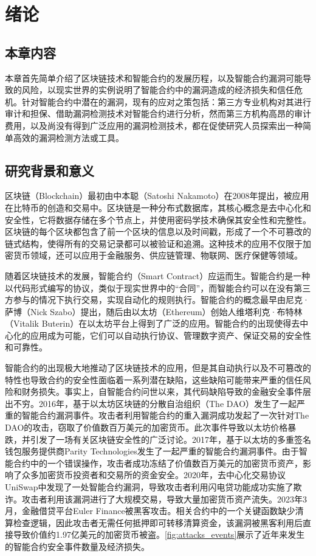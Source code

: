 \chapter{绪论}
\section{本章内容}
\label{sec:本章内容1}
本章首先简单介绍了区块链技术和智能合约的发展历程，以及智能合约漏洞可能导致的风险，以现实世界的实例说明了智能合约中的漏洞造成的经济损失和信任危机。针对智能合约中潜在的漏洞，现有的应对之策包括：第三方专业机构对其进行审计和担保、借助漏洞检测技术对智能合约进行分析，然而第三方机构高昂的审计费用，以及尚没有得到广泛应用的漏洞检测技术，都在促使研究人员探索出一种简单高效的漏洞检测方法或工具。


\section{研究背景和意义}
\label{sec:研究背景和意义}

区块链（Blockchain）最初由中本聪（Satoshi Nakamoto）在2008年提出\cite{nakamoto2008bitcoin}，被应用在比特币的创造和交易中。区块链是一种分布式数据库，其核心概念是去中心化和安全性，它将数据存储在多个节点上，并使用密码学技术确保其安全性和完整性。区块链的每个区块都包含了前一个区块的信息以及时间戳，形成了一个不可篡改的链式结构，使得所有的交易记录都可以被验证和追溯。这种技术的应用不仅限于加密货币领域，还可以应用于金融服务、供应链管理、物联网、医疗保健等领域。

随着区块链技术的发展，智能合约（Smart Contract）应运而生。智能合约是一种以代码形式编写的协议，类似于现实世界中的“合同”，而智能合约可以在没有第三方参与的情况下执行交易，实现自动化的规则执行。智能合约的概念最早由尼克·萨博（Nick Szabo）提出，随后由以太坊（Ethereum）创始人维塔利克·布特林（Vitalik Buterin）在以太坊平台上得到了广泛的应用。智能合约的出现使得去中心化的应用成为可能，它们可以自动执行协议、管理数字资产、保证交易的安全性和可靠性。

智能合约的出现极大地推动了区块链技术的应用，但是其自动执行以及不可篡改的特性也导致合约的安全性面临着一系列潜在缺陷，这些缺陷可能带来严重的信任风险和财务损失。事实上，自智能合约问世以来，其代码缺陷导致的金融安全事件层出不穷。2016年，基于以太坊区块链的分散自治组织（The DAO）发生了一起严重的智能合约漏洞事件。攻击者利用智能合约的重入漏洞成功发起了一次针对The DAO的攻击，窃取了价值数百万美元的加密货币。此次事件导致以太坊价格暴跌，并引发了一场有关区块链安全性的广泛讨论。2017年，基于以太坊的多重签名钱包服务提供商Parity Technologies发生了一起严重的智能合约漏洞事件。由于智能合约中的一个错误操作，攻击者成功冻结了价值数百万美元的加密货币资产，影响了众多加密货币投资者和交易所的资金安全\cite{niyuandong}。2020年，去中心化交易协议UniSwap中发现了一处智能合约漏洞，导致攻击者利用闪电贷功能成功实施了欺诈。攻击者利用该漏洞进行了大规模交易，导致大量加密货币资产流失。2023年3月，金融借贷平台Euler Finance被黑客攻击。相关合约中的一个关键函数缺少清算检查逻辑，因此攻击者无需任何抵押即可转移清算资金，该漏洞被黑客利用后直接导致价值约1.97亿美元的加密货币被盗。\autoref{fig:attacks_events}展示了近年来发生的智能合约安全事件数量及经济损失。

